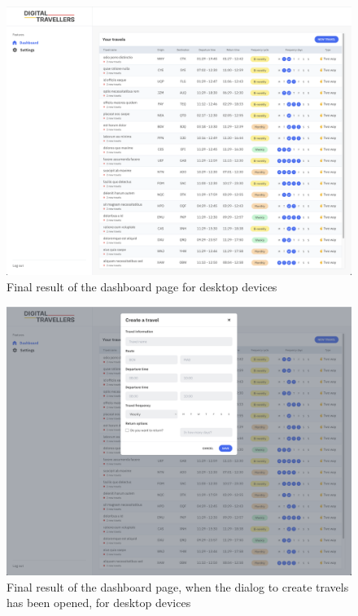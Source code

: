 \documentclass[./memory.tex]{subfiles}
\begin{document}
\begin{figure}[H]
	\centering
	\includegraphics[width=\textwidth]{./assets/results/desktop-dashboard.png}
	\caption{Final result of the dashboard page for desktop devices}
\end{figure}
\begin{figure}[H]
	\centering
	\includegraphics[width=\textwidth]{./assets/results/desktop-create.png}
	\caption{Final result of the dashboard page, when the dialog to create
		travels has been opened, for desktop devices}
\end{figure}
\end{document}
